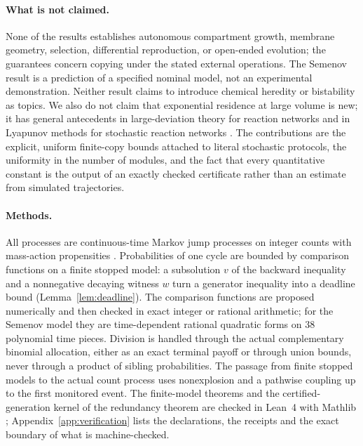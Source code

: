 \paragraph{What is not claimed.}
None of the results establishes autonomous compartment growth, membrane geometry, selection, differential reproduction, or open-ended evolution; the guarantees concern copying under the stated external operations. The Semenov result is a prediction of a specified nominal model, not an experimental demonstration. Neither result claims to introduce chemical heredity or bistability as topics. We also do not claim that exponential residence at large volume is new; it has general antecedents in large-deviation theory for reaction networks \citep{agazzi2018} and in Lyapunov methods for stochastic reaction networks \citep{gupta2014,kuntz2019}. The contributions are the explicit, uniform finite-copy bounds attached to literal stochastic protocols, the uniformity in the number of modules, and the fact that every quantitative constant is the output of an exactly checked certificate rather than an estimate from simulated trajectories.

\paragraph{Methods.}
All processes are continuous-time Markov jump processes on integer counts with mass-action propensities \citep{gillespie1977,kurtz1972,andersonkurtz2015}. Probabilities of one cycle are bounded by comparison functions on a finite stopped model: a subsolution $v$ of the backward inequality and a nonnegative decaying witness $w$ turn a generator inequality into a deadline bound (Lemma~\ref{lem:deadline}). The comparison functions are proposed numerically and then checked in exact integer or rational arithmetic; for the Semenov model they are time-dependent rational quadratic forms on $38$ polynomial time pieces. Division is handled through the actual complementary binomial allocation, either as an exact terminal payoff or through union bounds, never through a product of sibling probabilities. The passage from finite stopped models to the actual count process uses nonexplosion and a pathwise coupling up to the first monitored event. The finite-model theorems and the certified-generation kernel of the redundancy theorem are checked in Lean~4 with Mathlib \citep{demoura2021,mathlib2020}; Appendix~\ref{app:verification} lists the declarations, the receipts and the exact boundary of what is machine-checked.

